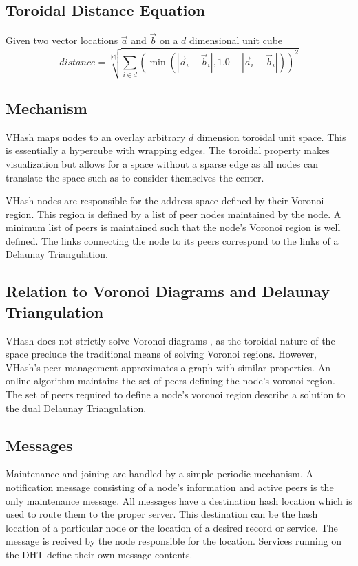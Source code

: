 \documentclass[11pt]{IEEEtran} %
\begin{document}
\subsection{Toroidal Distance Equation}

Given two vector locations $\vec{a}$ and $\vec{b}$ on a  $d$ dimensional unit cube
\[ distance = \sqrt[|d|]{\sum\limits_{i\in d} (\min(|\vec{a}_i-\vec{b}_i|,1.0-|\vec{a}_i-\vec{b}_i|))^2}\]

\subsection{Mechanism}
VHash maps nodes to an overlay arbitrary $d$ dimension toroidal unit space. This is essentially a hypercube with wrapping edges. The toroidal property makes visualization but allows for a space without a sparse edge as all nodes can translate the space such as to consider themselves the center.  

VHash nodes are responsible for the address space defined by their Voronoi region. This region is defined by a list of peer nodes maintained by the node. A minimum list of peers is maintained such that the node's Voronoi region is well defined. The links connecting the node to its peers correspond to the links of a Delaunay Triangulation. 

\subsection{Relation to Voronoi Diagrams and Delaunay Triangulation}

VHash does not strictly solve Voronoi diagrams \cite{voronoi}, as the toroidal nature of the space preclude the traditional means of solving Voronoi regions. However, VHash's peer management approximates a graph with similar properties. 
An online algorithm maintains the set of peers defining the node's voronoi region. The set of peers required to define a node's voronoi region describe a solution to the dual Delaunay Triangulation.

\subsection{Messages}
Maintenance and joining are handled by a simple periodic mechanism. A notification message consisting of a node's information and active peers is the only maintenance message. All messages have a destination hash location which is used to route them to the proper server. This destination can be the hash location of a particular node or the location of a desired record or service.  The message is recived by the node responsible for the location. Services running on the DHT define their own message contents.
\end{document}
